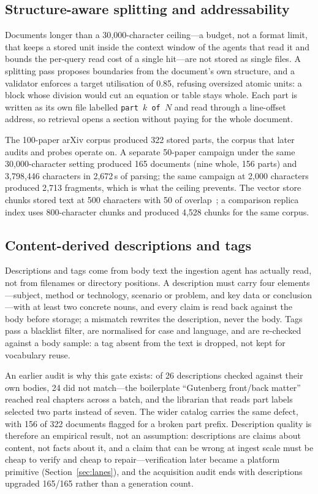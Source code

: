 \subsection{Structure-aware splitting and addressability}

Documents longer than a 30{,}000-character ceiling---a budget, not a
format limit, that keeps a stored unit inside the context window of the
agents that read it and bounds the per-query read cost of a single
hit---are not stored as single files. A splitting pass proposes
boundaries from the document's own structure, and a validator enforces
a target utilisation of 0.85, refusing oversized atomic units: a block
whose division would cut an equation or table stays whole. Each part is
written as its own file labelled \texttt{part $k$ of $N$} and read
through a line-offset address, so retrieval opens a section without
paying for the whole document.

The 100-paper arXiv corpus produced 322 stored parts, the corpus that
later audits and probes operate on. A separate 50-paper campaign under
the same 30{,}000-character setting produced 165 documents (nine whole,
156 parts) and 3{,}798{,}446 characters in 2{,}672\,s of parsing; the
same campaign at 2{,}000 characters produced 2{,}713 fragments, which is
what the ceiling prevents. The vector store chunks stored text at 500
characters with 50 of overlap~\citep{chroma,hnsw}; a comparison replica
index uses 800-character chunks and produced 4{,}528 chunks for the same
corpus.

\subsection{Content-derived descriptions and tags}

Descriptions and tags come from body text the ingestion agent has
actually read, not from filenames or directory positions. A description
must carry four elements---subject, method or technology, scenario or
problem, and key data or conclusion---with at least two concrete nouns,
and every claim is read back against the body before storage; a mismatch
rewrites the description, never the body. Tags pass a blacklist filter,
are normalised for case and language, and are re-checked against a
body sample: a tag absent from the text is dropped, not kept for
vocabulary reuse.

An earlier audit is why this gate exists: of 26 descriptions checked
against their own bodies, 24 did not match---the boilerplate
``Gutenberg front/back matter'' reached real chapters across a batch,
and the librarian that reads part labels selected two parts instead of
seven. The wider catalog carries the same defect, with 156 of 322
documents flagged for a broken part prefix. Description quality is
therefore an empirical result, not an assumption: descriptions are
claims about content, not facts about it, and a claim that can be wrong
at ingest scale must be cheap to verify and cheap to repair---verification
later became a platform primitive (Section~\ref{sec:lanes}), and the
acquisition audit ends with descriptions upgraded 165/165 rather than a
generation count.

